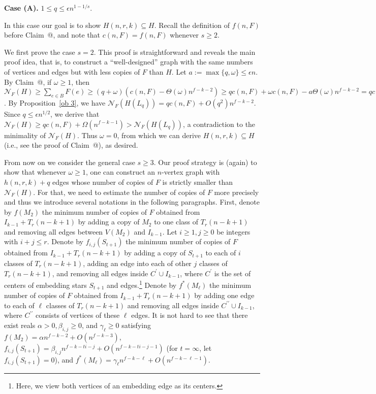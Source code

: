 \documentclass[10pt]{article}
\makeatletter
\newcommand*{\rom}[1]{\expandafter\@slowromancap\romannumeral #1@}
\makeatother
\begin{document}
\medskip

{\bf Case (A).} $1\leq q \leq \epsilon n^{1-1/s}$.

\medskip

In this case our goal is to show $H(n,r,k)\subseteq H$.
Recall the definition of $f(n,F)$ before Claim~\rom{3},
and note that $c(n,F)=f(n,F)$ whenever $s\geq 2$.

We first prove the case $s=2$.
This proof is straightforward and reveals the main proof idea, that is, to construct a ``well-designed'' graph with the same numbers of vertices and edges but with less copies of $F$ than $H$.
Let $a:=\max\{q,\omega\}\leq \epsilon n$.
By Claim~\rom{3}, if $\omega\geq 1$, then
$\mathcal{N}_F(H)\geq \sum_{e\in B}F(e)\geq (q+\omega)(c(n,F)- \Theta(\omega) n^{f-k-2})\geq qc(n,F)+\omega c(n,F)-a\Theta(\omega) n^{f-k-2}= qc(n,F)+\Omega(n^{f-k-1})$.
By Proposition~\ref{ob 3}, we have $\mathcal{N}_F(H(L_q))=qc(n,F)+O(q^2)n^{f-k-2}$.
Since $q\leq \epsilon n^{1/2}$, we derive that $\mathcal{N}_F(H)\geq qc(n,F)+\Omega(n^{f-k-1})> \mathcal{N}_F(H(L_q))$,
a contradiction to the minimality of $\mathcal{N}_F(H)$.
Thus $\omega=0$, from which we can derive $H(n,r,k)\subseteq H$ (i.e., see the proof of Claim~\rom{3}), as desired.

From now on we consider the general case $s\geq 3$.
Our proof strategy is (again) to show that whenever $\omega\geq 1$, one can construct an $n$-vertex graph with $h(n,r,k)+q$ edges whose number of copies of $F$ is strictly smaller than $\mathcal{N}_F(H)$.
For that, we need to estimate the number of copies of $F$ more precisely and thus we introduce several notations in the following paragraphs.
First, denote by $f(M_2)$ the minimum number of copies of $F$ obtained from $I_{k-1}+ T_r(n-k+1)$ by adding a copy of $M_2$ to one class of $T_r(n-k+1)$ and removing all edges between $V(M_2)$ and $I_{k-1}$.
Let $i\geq 1, j\geq 0$ be integers with $i+j\leq r$.
Denote by $f_{i,j}(S_{t+1})$ the minimum number of copies of $F$ obtained from $I_{k-1}+ T_r(n-k+1)$ by adding a copy of $S_{t+1}$ to each of $i$ classes of $T_r(n-k+1)$,
adding an edge into each of other $j$ classes of $T_r(n-k+1)$, and removing all edges inside $C^\prime\cup I_{k-1}$,
where $C^\prime$ is the set of centers of embedding stars $S_{t+1}$ and edges.\footnote{Here, we view both vertices of an embedding edge as its centers.}
Denote by $f^\ast(M_\ell)$ the minimum number of copies of $F$ obtained from $I_{k-1}+ T_r(n-k+1)$ by adding one edge to each of $\ell$ classes of $T_r(n-k+1)$ and removing all edges inside $C^{\prime\prime}\cup I_{k-1}$, where $C^{\prime\prime}$ consists of vertices of these $\ell$ edges.
It is not hard to see that there exist reals $\alpha>0, \beta_{i,j}\geq 0$, and $\gamma_\ell\geq 0$ satisfying $f(M_2)=\alpha n^{f-k-2}+O(n^{f-k-3})$, $f_{i,j}(S_{t+1})=\beta_{i,j} n^{f-k-ti-j}+O(n^{f-k-ti-j-1})$ (for $t= \infty$, let $f_{i,j}(S_{t+1})=0$), and $f^\ast(M_\ell)=\gamma_\ell n^{f-k-\ell}+O(n^{f-k-\ell-1})$.
\end{document}
